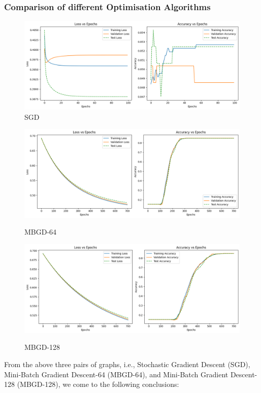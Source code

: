 \documentclass{article}
\begin{document}
\subsubsection*{Comparison of different Optimisation Algorithms}
\vspace{10pt}
\begin{figure}[H] %
    \centering
    \includegraphics[width=0.5\linewidth]{assets/d-SGD.png}
    \caption{SGD}
    \label{fig:a}
\end{figure}
\begin{figure}[H] %
    \centering
    \begin{minipage}{0.49\linewidth}
        \centering
        \includegraphics[width=\linewidth]{assets/d-MBGD-64.png}
        \caption{MBGD-64}{}
        \label{fig:b-1}
    \end{minipage}
    \hfill
    \begin{minipage}{0.49\linewidth}
        \centering
        \includegraphics[width=\linewidth]{assets/d-MBGD-128.png}
        \caption{MBGD-128}{}
        \label{fig:b-2}
    \end{minipage}
\end{figure}
\hspace{0pt}From the above three pairs of graphs, i.e., Stochastic Gradient Descent (SGD), Mini-Batch Gradient Descent-64 (MBGD-64), and Mini-Batch Gradient Descent-128 (MBGD-128), we come to the following conclusions:
\end{document}
